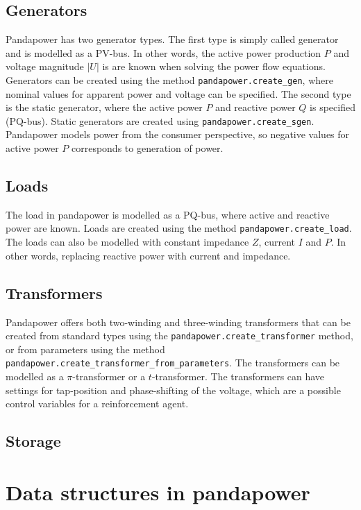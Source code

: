 \documentclass[class=book, crop=false]{standalone}
\begin{document}
\subsection{Generators}
Pandapower has two generator types. The first type is simply called generator and is modelled as a PV-bus. In other words, the active power production $P$ and voltage magnitude $|U|$ is are known when solving the power flow equations. Generators can be created using the method \texttt{pandapower.create\_gen}, where nominal values for apparent power and voltage can be specified. The second type is the static generator, where the active power $P$ and reactive power $Q$ is specified (PQ-bus). Static generators are created using \texttt{pandapower.create\_sgen}. Pandapower models power from the consumer perspective, so negative values for active power $P$ corresponds to generation of power.

\subsection{Loads}
The load in pandapower is modelled as a PQ-bus, where active and reactive power are known. Loads are created using the method \texttt{pandapower.create\_load}. The loads can also be modelled with constant impedance $Z$, current $I$ and $P$. In other words, replacing reactive power with current and impedance.

\subsection{Transformers}
Pandapower offers both two-winding and three-winding transformers that can be created from standard types using the \texttt{pandapower.create\_transformer} method, or from parameters using the method
\texttt{pandapower.create\_transformer\_from\_parameters}. The transformers can be modelled as a $\pi$-transformer or a $t$-transformer. The transformers can have settings for tap-position and phase-shifting of the voltage, which are a possible control variables for a reinforcement agent.  

\subsection{Storage}


\section{Data structures in pandapower}
\end{document}
